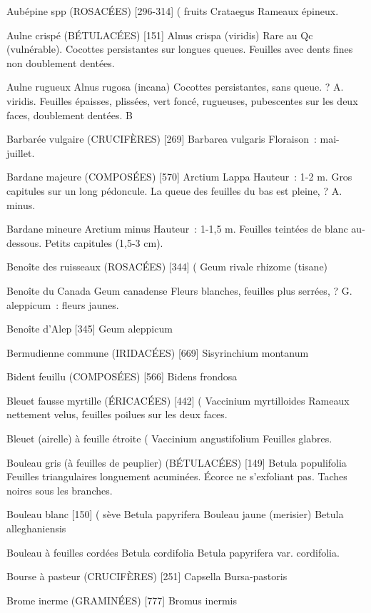 \documentclass[book,12pt,a4paper,onecolumn,openany]{memoir}
\begin{document}
Aubépine spp (ROSACÉES)  [296-314]				( fruits
				Crataegus
Rameaux épineux.

Aulne crispé (BÉTULACÉES)  [151]
				Alnus crispa (viridis)
Rare au Qc (vulnérable). Cocottes persistantes sur longues queues.
Feuilles avec dents fines non doublement dentées.

Aulne rugueux
				Alnus rugosa (incana)
Cocottes persistantes, sans queue. ? A. viridis.
Feuilles épaisses, plissées, vert foncé, rugueuses, pubescentes sur les deux faces, doublement dentées.
B

Barbarée vulgaire (CRUCIFÈRES)  [269]
				Barbarea vulgaris
Floraison : mai-juillet.

Bardane majeure (COMPOSÉES)  [570]
				Arctium Lappa
Hauteur : 1-2 m. Gros capitules sur un long pédoncule. La queue des feuilles du bas est pleine, ? A. minus.

Bardane mineure
				Arctium minus
Hauteur : 1-1,5 m. Feuilles teintées de blanc au-dessous. Petits capitules (1,5-3 cm).

Benoîte des ruisseaux (ROSACÉES)  [344]			(
				Geum rivale			rhizome (tisane)

Benoîte du Canada
				Geum canadense
Fleurs blanches, feuilles plus serrées, ? G. aleppicum : fleurs jaunes.


Benoîte d’Alep  [345]
				Geum aleppicum

Bermudienne commune (IRIDACÉES)  [669]
				Sisyrinchium montanum

Bident feuillu (COMPOSÉES)  [566]
				Bidens frondosa

Bleuet fausse myrtille (ÉRICACÉES)  [442]			(
				Vaccinium myrtilloides
Rameaux nettement velus, feuilles poilues sur les deux faces.

Bleuet (airelle) à feuille étroite					(
				Vaccinium angustifolium
Feuilles glabres.

Bouleau gris (à feuilles de peuplier) (BÉTULACÉES) [149]
				Betula populifolia
Feuilles triangulaires longuement acuminées.
Écorce ne s’exfoliant pas.
Taches noires sous les branches.

Bouleau blanc  [150]							( sève
				Betula papyrifera
Bouleau jaune (merisier)
				Betula alleghaniensis

Bouleau à feuilles cordées
				Betula cordifolia
    Betula papyrifera var. cordifolia.

Bourse à pasteur (CRUCIFÈRES)  [251]
				Capsella Bursa-pastoris

Brome inerme (GRAMINÉES)  [777]
				Bromus inermis
\end{document}
